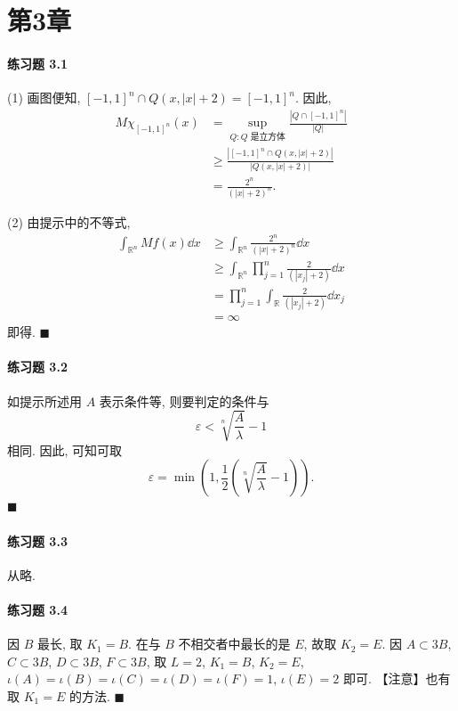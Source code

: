 \section*{第3章}

\paragraph*{练习题 3.1}
(1) 画图便知, $[-1,1]^{n} \cap Q(x, |x|+2) = [-1,1]^{n}$. 因此,
\begin{align*}
M\chi_{[-1,1]^{n}}(x) &= \sup_{Q: Q \text{ 是立方体}}\frac{|Q \cap [-1,1]^{n}|}{|Q|} \\
&\geq \frac{|[-1,1]^{n} \cap Q(x, |x|+2)|}{|Q(x, |x|+2)|} \\
&= \frac{2^{n}}{(|x|+2)^{n}}.
\end{align*}

(2) 由提示中的不等式,
\begin{align*}
\int_{\mathbb{R}^{n}}Mf(x)\dd x &\geq \int_{\mathbb{R}^{n}}\frac{2^{n}}{(|x|+2)^{n}}\dd x \\
&\geq \int_{\mathbb{R}^{n}}\prod_{j=1}^{n}\frac{2}{(|x_{j}|+2)}\dd x \\
&= \prod_{j=1}^{n}\int_{\mathbb{R}}\frac{2}{(|x_{j}|+2)}\dd x_{j} \\
&= \infty
\end{align*}
即得. $\blacksquare$

\paragraph*{练习题 3.2}
如提示所述用 $A$ 表示条件等, 则要判定的条件与
\[
\varepsilon < \sqrt[n]{\frac{A}{\lambda}} - 1
\]
相同. 因此, 可知可取
\[
\varepsilon = \min\left(1, \frac{1}{2}\left(\sqrt[n]{\frac{A}{\lambda}} - 1\right)\right).
\]
$\blacksquare$

\paragraph*{练习题 3.3}
从略.

\paragraph*{练习题 3.4}
因 $B$ 最长, 取 $K_{1} = B$. 在与 $B$ 不相交者中最长的是 $E$, 故取 $K_{2} = E$. 因 $A \subset 3B$, $C \subset 3B$, $D \subset 3B$, $F \subset 3B$, 取 $L = 2$, $K_{1} = B$, $K_{2} = E$, $\iota(A) = \iota(B) = \iota(C) = \iota(D) = \iota(F) = 1$, $\iota(E) = 2$ 即可. 【注意】也有取 $K_{1} = E$ 的方法. $\blacksquare$

